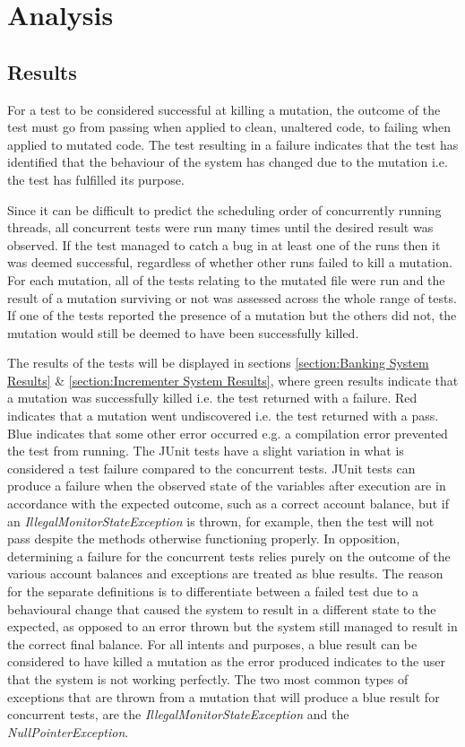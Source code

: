 \documentclass[a4paper,12pt]{article}
\begin{document}
\newpage	
\section{Analysis}
\subsection{Results}

For a test to be considered successful at killing a mutation, the outcome of the test must go from passing when applied to clean, unaltered code, to failing when applied to mutated code. The test resulting in a failure indicates that the test has identified that the behaviour of the system has changed due to the mutation i.e. the test has fulfilled its purpose. 

Since it can be difficult to predict the scheduling order of concurrently running threads, all concurrent tests were run many times until the desired result was observed. If the test managed to catch a bug in at least one of the runs then it was deemed successful, regardless of whether other runs failed to kill a mutation. For each mutation, all of the tests relating to the mutated file were run and the result of a mutation surviving or not was assessed across the whole range of tests. If one of the tests reported the presence of a mutation but the others did not, the mutation would still be deemed to have been successfully killed.

The results of the tests will be displayed in sections \ref{section:Banking System Results} \& \ref{section:Incrementer System Results}, where green results indicate that a mutation was successfully killed i.e. the test returned with a failure. Red indicates that a mutation went undiscovered i.e. the test returned with a pass. Blue indicates that some other error occurred e.g. a compilation error prevented the test from running. The JUnit tests have a slight variation in what is considered a test failure compared to the concurrent tests. JUnit tests can produce a failure when the observed state of the variables after execution are in accordance with the expected outcome, such as a correct account balance, but if an \textit{IllegalMonitorStateException} is thrown, for example, then the test will not pass despite the methods otherwise functioning properly. In opposition, determining a failure for the concurrent tests relies purely on the outcome of the various account balances and exceptions are treated as blue results. The reason for the separate definitions is to differentiate between a failed test due to a behavioural change that caused the system to result in a different state to the expected, as opposed to an error thrown but the system still managed to result in the correct final balance. For all intents and purposes, a blue result can be considered to have killed a mutation as the error produced indicates to the user that the system is not working perfectly. 
The two most common types of exceptions that are thrown from a mutation that will produce a blue result for concurrent tests, are the \textit{IllegalMonitorStateException} and the \textit{NullPointerException}. 
\end{document}
